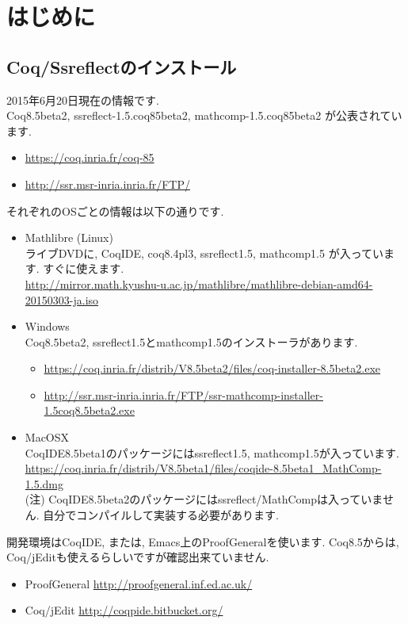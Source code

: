 \chapter*{はじめに}

\section*{Coq/Ssreflectのインストール}
\noindent
2015年6月20日現在の情報です. \\
Coq8.5beta2, ssreflect-1.5.coq85beta2,
mathcomp-1.5.coq85beta2 が公表されています.
\begin{itemize}
 \item \url{https://coq.inria.fr/coq-85}
 \item \url{http://ssr.msr-inria.inria.fr/FTP/}
\end{itemize}
それぞれのOSごとの情報は以下の通りです.
\begin{itemize}
\item Mathlibre (Linux) \\
      ライブDVDに, CoqIDE, coq8.4pl3, ssreflect1.5, mathcomp1.5 が入っています.
      すぐに使えます.\\
\url{http://mirror.math.kyushu-u.ac.jp/mathlibre/mathlibre-debian-amd64-20150303-ja.iso}
\item Windows \\
      Coq8.5beta2, ssreflect1.5とmathcomp1.5のインストーラがあります.
  \begin{itemize}
   \item \url{https://coq.inria.fr/distrib/V8.5beta2/files/coq-installer-8.5beta2.exe}
   \item \url{http://ssr.msr-inria.inria.fr/FTP/ssr-mathcomp-installer-1.5coq8.5beta2.exe}
  \end{itemize}
\item MacOSX \\
      CoqIDE8.5beta1のパッケージにはssreflect1.5, mathcomp1.5が入っています.\\
      \url{https://coq.inria.fr/distrib/V8.5beta1/files/coqide-8.5beta1_MathComp-1.5.dmg}\\
      (注) CoqIDE8.5beta2のパッケージにはssreflect/MathCompは入っていません.
      自分でコンパイルして実装する必要があります.
\end{itemize}

開発環境はCoqIDE, または, Emacs上のProofGeneralを使います.
Coq8.5からは, Coq/jEditも使えるらしいですが確認出来ていません.
 \begin{itemize}
  \item ProofGeneral \url{http://proofgeneral.inf.ed.ac.uk/}
  \item Coq/jEdit \url{http://coqpide.bitbucket.org/}
 \end{itemize}
 


